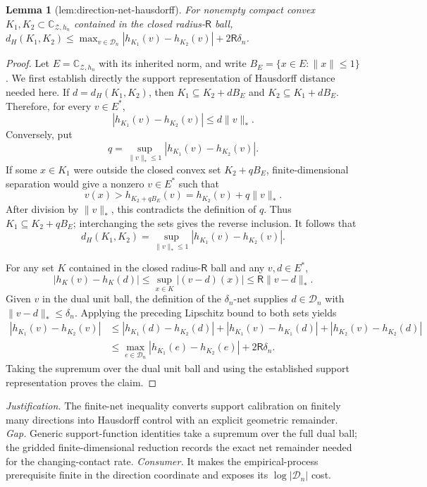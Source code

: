 \documentclass{article}
\newtheorem{lemma}{Lemma}
\begin{document}
\begin{lemma}[lem:direction-net-hausdorff]\label{lem:direction-net-hausdorff}
For nonempty compact convex \(K_1,K_2\subset\mathbb C_{\mathcal Z,h_n}\) contained in the closed radius-\(\mathsf R\) ball, \(d_H(K_1,K_2)\le\max_{v\in\mathcal D_n}|h_{K_1}(v)-h_{K_2}(v)|+2\mathsf R\delta_n\).
\end{lemma}
\begin{proof}
Let \(E=\mathbb C_{\mathcal Z,h_n}\) with its inherited norm, and write
\(B_E=\{x\in E:\|x\|\le1\}\).  We first establish directly the support
representation of Hausdorff distance needed here.  If
\(d=d_H(K_1,K_2)\), then
\(K_1\subseteq K_2+dB_E\) and \(K_2\subseteq K_1+dB_E\).  Therefore, for
every \(v\in E^*\),
\[
 |h_{K_1}(v)-h_{K_2}(v)|\le d\|v\|_*.
\]
Conversely, put
\[
 q=\sup_{\|v\|_*\le1}|h_{K_1}(v)-h_{K_2}(v)|.
\]
If some \(x\in K_1\) were outside the closed convex set \(K_2+qB_E\),
finite-dimensional separation would give a nonzero \(v\in E^*\) such that
\[
 v(x)>h_{K_2+qB_E}(v)=h_{K_2}(v)+q\|v\|_*.
\]
After division by \(\|v\|_*\), this contradicts the definition of \(q\).
Thus \(K_1\subseteq K_2+qB_E\); interchanging the sets gives the reverse
inclusion.  It follows that
\[
 d_H(K_1,K_2)=
 \sup_{\|v\|_*\le1}|h_{K_1}(v)-h_{K_2}(v)|.
\]

For any set \(K\) contained in the closed radius-\(\mathsf R\) ball and any
\(v,d\in E^*\),
\[
 |h_K(v)-h_K(d)|
 \le\sup_{x\in K}|(v-d)(x)|
 \le\mathsf R\|v-d\|_*.
\]
Given \(v\) in the dual unit ball, the definition of the
\(\delta_n\)-net supplies \(d\in\mathcal D_n\) with
\(\|v-d\|_*\le\delta_n\).  Applying the preceding Lipschitz bound to both
sets yields
\[
\begin{aligned}
|h_{K_1}(v)-h_{K_2}(v)|
&\le |h_{K_1}(d)-h_{K_2}(d)|
   +|h_{K_1}(v)-h_{K_1}(d)|
   +|h_{K_2}(v)-h_{K_2}(d)|\\
&\le \max_{e\in\mathcal D_n}|h_{K_1}(e)-h_{K_2}(e)|
   +2\mathsf R\delta_n.
\end{aligned}
\]
Taking the supremum over the dual unit ball and using the established
support representation proves the claim.
\end{proof}
\par\smallskip\noindent \textit{Justification.} The finite-net inequality converts support calibration on finitely many directions into Hausdorff control with an explicit geometric remainder. \textit{Gap.} Generic support-function identities take a supremum over the full dual ball; the gridded finite-dimensional reduction records the exact net remainder needed for the changing-contact rate. \textit{Consumer.} It makes the empirical-process prerequisite finite in the direction coordinate and exposes its \(\log|\mathcal D_n|\) cost.
\end{document}
